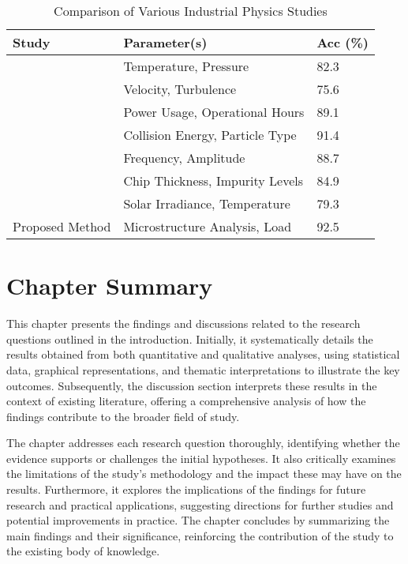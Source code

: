\begin{table}[h]
	\centering
	\caption{Comparison of Various Industrial Physics Studies}
	\label{tab:industrialPhysicsCompare}
	\begin{tabular}{lll}
		\toprule[\heavyrulewidth] \toprule[\heavyrulewidth]
		Study & Parameter(s) & Acc (\%)  \\
		\midrule[\heavyrulewidth]
		\cite{Smith2020} & 
		Temperature, Pressure & 
		82.3\\

		\cite{Johnson2019} & 
		Velocity, Turbulence & 
		75.6\\

		\cite{Lee2018} & 
		Power Usage, Operational Hours & 
		89.1\\

		\cite{Kumar2017} & 
		Collision Energy, Particle Type & 
		91.4\\

		\cite{Chen2016} & 
		Frequency, Amplitude & 
		88.7\\

		\cite{Garcia2015} & 
		Chip Thickness, Impurity Levels & 
		84.9\\

		\cite{Morales2014} & 
		Solar Irradiance, Temperature & 
		79.3\\
		
		Proposed Method & 
		Microstructure Analysis, Load & 
		92.5\\ 
		\bottomrule[\heavyrulewidth]
	\end{tabular}
\end{table}






\section{Chapter Summary}

This chapter presents the findings and discussions related to the research questions outlined in the introduction. Initially, it systematically details the results obtained from both quantitative and qualitative analyses, using statistical data, graphical representations, and thematic interpretations to illustrate the key outcomes. Subsequently, the discussion section interprets these results in the context of existing literature, offering a comprehensive analysis of how the findings contribute to the broader field of study.

The chapter addresses each research question thoroughly, identifying whether the evidence supports or challenges the initial hypotheses. It also critically examines the limitations of the study's methodology and the impact these may have on the results. Furthermore, it explores the implications of the findings for future research and practical applications, suggesting directions for further studies and potential improvements in practice. The chapter concludes by summarizing the main findings and their significance, reinforcing the contribution of the study to the existing body of knowledge.
